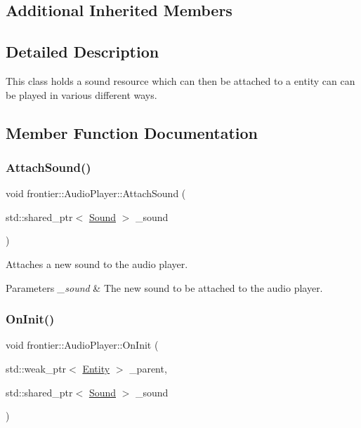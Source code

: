 \subsection*{Additional Inherited Members}


\subsection{Detailed Description}
This class holds a sound resource which can then be attached to a entity can can be played in various different ways. 

\subsection{Member Function Documentation}
\mbox{\label{classfrontier_1_1_audio_player_abb7536bee69926c8643a9c3ab6eb714f}} 
\subsubsection{\texorpdfstring{Attach\+Sound()}{AttachSound()}}
{\footnotesize\ttfamily void frontier\+::\+Audio\+Player\+::\+Attach\+Sound (\begin{DoxyParamCaption}\item[{std\+::shared\+\_\+ptr$<$ \hyperlink{classfrontier_1_1_sound}{Sound} $>$}]{\+\_\+sound }\end{DoxyParamCaption})}



Attaches a new sound to the audio player. 


\begin{DoxyParams}{Parameters}
{\em \+\_\+sound} & The new sound to be attached to the audio player. \\
\hline
\end{DoxyParams}
\mbox{\label{classfrontier_1_1_audio_player_a6a000a15e398c4de2eb767c4a4cbede7}} 
\subsubsection{\texorpdfstring{On\+Init()}{OnInit()}}
{\footnotesize\ttfamily void frontier\+::\+Audio\+Player\+::\+On\+Init (\begin{DoxyParamCaption}\item[{std\+::weak\+\_\+ptr$<$ \hyperlink{classfrontier_1_1_entity}{Entity} $>$}]{\+\_\+parent,  }\item[{std\+::shared\+\_\+ptr$<$ \hyperlink{classfrontier_1_1_sound}{Sound} $>$}]{\+\_\+sound }\end{DoxyParamCaption})}




